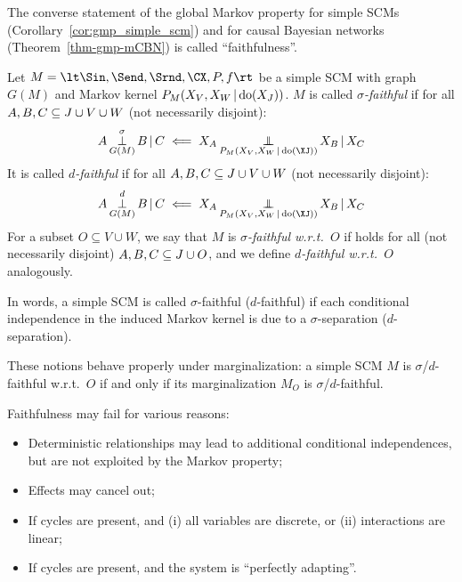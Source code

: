The converse statement of the global Markov property for simple SCMs (Corollary~\ref{cor:gmp_simple_scm})
and for causal Bayesian networks (Theorem~\ref{thm-gmp-mCBN}) is called ``faithfulness''.
\begin{Def}\label{def:faithfulness}
  Let $M = \lt \Sin, \Send, \Srnd, \CX, P, f \rt$ be a simple SCM with graph $G(M)$
  and Markov kernel $P_{M}(X_V,X_W \operatorname*{|} \operatorname{do}(X_J))$.
  $M$ is called \emph{$\sigma$-faithful} if 
  for all $A, B, C \subseteq J \cup V \cup W$ (not necessarily disjoint):
  \begin{equation}\label{eq:sigma_faithful}
    A \Perp^\sigma_{G(M)} B \given C \impliedby X_A \Indep_{P_{M}(X_V,X_W \given \doit(\XJ))} X_B \given X_C
  \end{equation}
  It is called \emph{$d$-faithful} if
  for all $A, B, C \subseteq J \cup V \cup W$ (not necessarily disjoint):
  \begin{equation}\label{eq:d_faithful}
    A \Perp^d_{G(M)} B \given C \impliedby X_A \Indep_{P_{M}(X_V,X_W \given \doit(\XJ))} X_B \given X_C
  \end{equation}
  For a subset $O \subseteq V \cup W$, we say that $M$ is \emph{$\sigma$-faithful w.r.t.\ $O$} if
   holds for all (not necessarily disjoint) $A, B, C \subseteq J \cup O$, and we define
  \emph{$d$-faithful w.r.t.\ $O$} analogously.
\end{Def}
In words, a simple SCM is called $\sigma$-faithful ($d$-faithful) if each conditional independence in the induced Markov kernel
is due to a $\sigma$-separation ($d$-separation).
\begin{Rem}
These notions behave properly under marginalization: a simple SCM $M$ is $\sigma$/$d$-faithful w.r.t.\ $O$ if and only if
its marginalization $M_O$ is $\sigma$/$d$-faithful.
\end{Rem}

Faithfulness may fail for various reasons:
\begin{itemize}
  \item Deterministic relationships may lead to additional conditional independences, but are not exploited by the Markov property;
  \item Effects may cancel out;
  \item If cycles are present, and (i) all variables are discrete, or (ii) interactions are linear;
  \item If cycles are present, and the system is ``perfectly adapting''.
\end{itemize}


